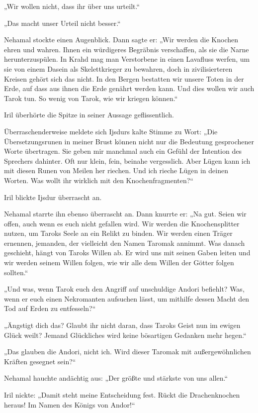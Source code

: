 „Wir wollen nicht, dass ihr über uns urteilt.“

„Das macht unser Urteil nicht besser.“

Nehamal stockte einen Augenblick. Dann sagte er: „Wir werden die Knochen ehren und wahren. Ihnen ein würdigeres Begräbnis verschaffen, als sie die Narne herunterzuspülen. In Krahd mag man Verstorbene in einen Lavafluss werfen, um sie von einem Dasein als Skelettkrieger zu bewahren, doch in zivilisierteren Kreisen gehört sich das nicht. In den Bergen bestatten wir unsere Toten in der Erde, auf dass aus ihnen die Erde genährt werden kann. Und dies wollen wir auch Tarok tun. So wenig von Tarok, wie wir kriegen können.“

Iril überhörte die Spitze in seiner Aussage geflissentlich.

Überraschenderweise meldete sich Ijsdurs kalte Stimme zu Wort: „Die Übersetzungsrunen in meiner Brust können nicht nur die Bedeutung gesprochener Worte übertragen. Sie geben mir manchmal auch ein Gefühl der Intention des Sprechers dahinter. Oft nur klein, fein, beinahe vergesslich. Aber Lügen kann ich mit diesen Runen von Meilen her riechen. Und ich rieche Lügen in deinen Worten. Was wollt ihr wirklich mit den Knochenfragmenten?“

Iril blickte Ijsdur überrascht an.

Nehamal starrte ihn ebenso überrascht an. Dann knurrte er: „Na gut. Seien wir offen, auch wenn es euch nicht gefallen wird. Wir werden die Knochensplitter nutzen, um Taroks Seele an ein Relikt zu binden. Wir werden einen Träger ernennen, jemanden, der vielleicht den Namen Taromak annimmt. Was danach geschieht, hängt von Taroks Willen ab. Er wird uns mit seinen Gaben leiten und wir werden seinem Willen folgen, wie wir alle dem Willen der Götter folgen sollten.“

„Und was, wenn Tarok euch den Angriff auf unschuldige Andori befiehlt? Was, wenn er euch einen Nekromanten aufsuchen lässt, um mithilfe dessen Macht den Tod auf Erden zu entfesseln?“

„Ängstigt dich das? Glaubt ihr nicht daran, dass Taroks Geist nun im ewigen Glück weilt? Jemand Glückliches wird keine bösartigen Gedanken mehr hegen.“

„Das glauben die Andori, nicht ich. Wird dieser Taromak mit außergewöhnlichen Kräften gesegnet sein?“

Nehamal hauchte andächtig aus: „Der größte und stärkste von uns allen.“

Iril nickte: „Damit steht meine Entscheidung fest. Rückt die Drachenknochen heraus! Im Namen des Königs von Andor!“

